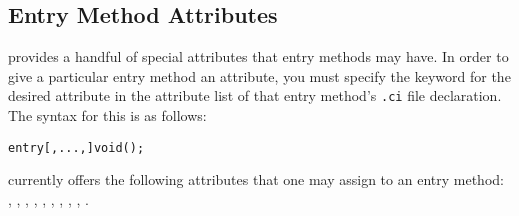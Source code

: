 \subsection{Entry Method Attributes}

\label{attributes}

\charmpp{}  provides a handful of special attributes that entry methods may have.  In order to give a particular entry method an attribute, you must specify the keyword for the desired
attribute in the attribute list of that entry method's {\tt .ci} file
declaration.  The syntax for this is as follows:

\begin{alltt}
entry [, ..., ] void ();
\end{alltt}

\charmpp{} currently offers the following attributes that one may assign to 
an entry method:
, , , , , , , , , .

